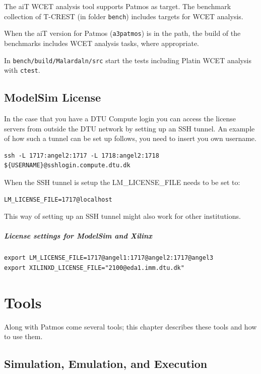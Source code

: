 \documentclass[a4paper,fontsize=10pt,twoside,DIV15,BCOR12mm,headinclude=true,footinclude=false,pagesize,bibtotoc]{scrbook}
\newcommand{\code}[1]{{\texttt{#1}}}
\begin{document}
The aiT WCET analysis tool supports Patmos as target. The benchmark collection
of T-CREST (in folder \code{bench}) includes targets for WCET analysis.

When the aiT version for Patmos (\code{a3patmos}) is in the path, the build of
the benchmarks includes WCET analysis tasks, where appropriate.

In \code{bench/build/Malardaln/src} start the tests including Platin WCET analysis with \code{ctest}.


\section{ModelSim License}
In the case that you have a DTU Compute login you can access the license servers from outside the DTU network by setting up an SSH tunnel.
An example of how such a tunnel can be set up follows, you need to insert you own username.

\begin{verbatim}
ssh -L 1717:angel2:1717 -L 1718:angel2:1718 ${USERNAME}@sshlogin.compute.dtu.dk
\end{verbatim}

When the SSH tunnel is setup the LM\_LICENSE\_FILE needs to be set to:
\begin{verbatim}
LM_LICENSE_FILE=1717@localhost
\end{verbatim}

This way of setting up an SSH tunnel might also work for other institutions.

\paragraph{License settings for ModelSim and Xilinx}

\begin{verbatim}
export LM_LICENSE_FILE=1717@angel1:1717@angel2:1717@angel3
export XILINXD_LICENSE_FILE="2100@eda1.imm.dtu.dk"
\end{verbatim}





\chapter{Tools}

Along with Patmos come several tools; this chapter describes these
tools and how to use them.

\section{Simulation, Emulation, and Execution}
\end{document}
